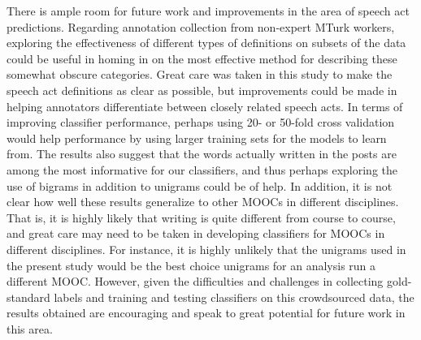 \documentclass[twoside]{article}
\begin{document}
There is ample room for future work and improvements in the area of speech act predictions. Regarding annotation collection from non-expert MTurk workers, exploring the effectiveness of different types of definitions on subsets of the data could be useful in homing in on the most effective method for describing these somewhat obscure categories. Great care was taken in this study to make the speech act definitions as clear as possible, but improvements could be made in helping annotators differentiate between closely related speech acts. In terms of improving classifier performance, perhaps using 20-  or 50-fold cross validation would help performance by using larger training sets for the models to learn from. The results also suggest that the words actually written in the posts are among the most informative for our classifiers, and thus perhaps exploring the use of bigrams in addition to unigrams could be of help. In addition, it is not clear how well these results generalize to other MOOCs in different disciplines. That is, it is highly likely that writing is quite different from course to course, and great care may need to be taken in developing classifiers for MOOCs in different disciplines. For instance, it is highly unlikely that the unigrams used in the present study would be the best choice unigrams for an analysis run a different MOOC. However, given the difficulties and challenges in collecting gold-standard labels and training and testing classifiers on this crowdsourced data, the results obtained are encouraging and speak to great potential for future work in this area.



\end{document}
